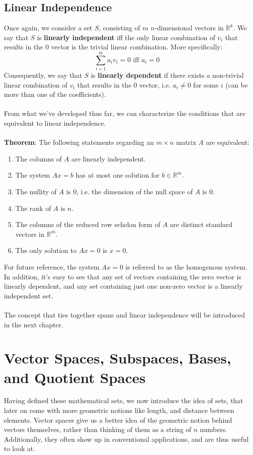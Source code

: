 \documentclass[11pt]{report}
\newcommand{\R}{\mathbb{R}}
\begin{document}
\section{Linear Independence}
Once again, we consider a set $S$, consisting of $m$ $n$-dimensional vectors in $\R^k$. We say that $S$ is \textbf{linearly independent} iff the only linear combination of $v_i$ that results in the $0$ vector is the trivial linear combination. More specifically:
$$\sum_{i=1}^{m} a_iv_i = 0 \text{ iff } a_i = 0$$
Consequently, we say that $S$ is \textbf{linearly dependent} if there exists a non-trivial linear combination of $v_i$ that results in the $0$ vector, i.e. $a_i \ne 0$ for some $i$ (can be more than one of the coefficients).
\\ \\
From what we've developed thus far, we can characterize the conditions that are equivalent to linear independence.
\\ \\
\textbf{Theorem}: The following statements regarding an $m \times n$ matrix $A$ are equivalent:
\begin{enumerate}
\item The columns of $A$ are linearly independent.
\item The system $Ax = b$ has at most one solution for $b \in \R^m$.
\item The nullity of $A$ is $0$, i.e. the dimension of the null space of $A$ is $0$.
\item The rank of $A$ is $n$.
\item The columns of the reduced row echelon form of $A$ are distinct standard vectors in $\R^m$.
\item The only solution to $Ax = 0$ is $x = 0$.
\end{enumerate}
For future reference, the system $Ax = 0$ is referred to as the homogenous system. In addition, it's easy to see that any set of vectors containing the zero vector is linearly dependent, and any set containing just one non-zero vector is a linearly independent set. 
\\ \\
The concept that ties together spans and linear independence will be introduced in the next chapter.
\chapter{Vector Spaces, Subspaces, Bases, and Quotient Spaces}
Having defined these mathematical sets, we now introduce the idea of sets, that later on come with more geometric notions like length, and distance between elements. Vector spaces give us a better idea of the geometric notion behind vectors themselves, rather than thinking of them as a string of $n$ numbers. Additionally, they often show up in conventional applications, and are thus useful to look at.
\end{document}
